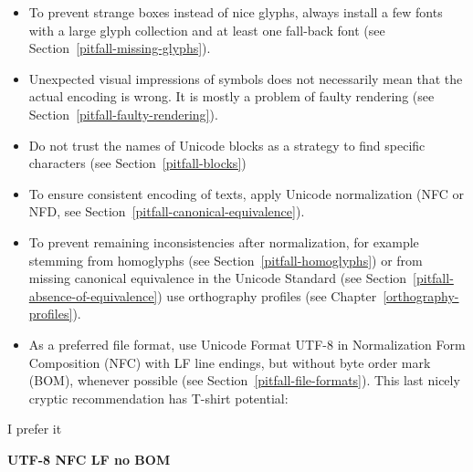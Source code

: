 \begin{itemize}
   \item To prevent strange boxes instead of nice glyphs, always install a few
         fonts with a large glyph collection and at least one fall-back font
         (see Section~\ref{pitfall-missing-glyphs}).
   \item Unexpected visual impressions of symbols does not necessarily mean that
         the actual encoding is wrong. It is mostly a problem of faulty
         rendering (see Section~\ref{pitfall-faulty-rendering}).
   \item Do not trust the names of Unicode blocks as a strategy to find specific 
         characters (see Section~\ref{pitfall-blocks})
   \item To ensure consistent encoding of texts, apply Unicode normalization
         (NFC or NFD, see Section~\ref{pitfall-canonical-equivalence}).
   \item To prevent remaining inconsistencies after normalization, for example 
         stemming from homoglyphs (see Section~\ref{pitfall-homoglyphs}) 
         or from missing canonical equivalence in the Unicode Standard
         (see Section~\ref{pitfall-absence-of-equivalence})
         use orthography profiles (see Chapter~\ref{orthography-profiles}).
   \item As a preferred file format, use Unicode Format UTF-8 in 
         Normalization Form Composition (NFC) with LF line endings, 
         but without byte order mark (BOM), whenever possible (see 
         Section~\ref{pitfall-file-formats}). This last nicely cryptic 
         recommendation has T-shirt potential:
  
\end{itemize}

\begin{center}
  I prefer it
  
  \textbf{UTF-8 NFC LF no BOM}
\end{center}


